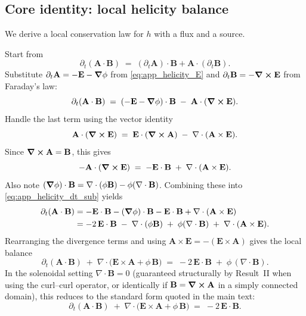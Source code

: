 \documentclass[11pt]{article}
\theoremstyle{plain}
\theoremstyle{definition}
\theoremstyle{remark}
\newcommand{\diver}{\nabla\cdot}
\newcommand{\A}{\mathbf{A}}
\newcommand{\B}{\mathbf{B}}
\newcommand{\E}{\mathbf{E}}
\begin{document}
\subsection{Core identity: local helicity balance}
We derive a local conservation law for $h$ with a flux and a source.

Start from
\begin{equation}\label{eq:app_helicity_dt_start}
  \partial_t(\A\cdot\B) \;=\; (\partial_t\A)\cdot\B + \A\cdot(\partial_t\B).
\end{equation}
Substitute $\partial_t\A = -\E - \grad\phi$ from \eqref{eq:app_helicity_E} and
$\partial_t\B=-\curl\E$ from Faraday's law:
\begin{equation}\label{eq:app_helicity_dt_sub}
  \partial_t(\A\cdot\B)
  \;=\;
  (-\E-\grad\phi)\cdot\B \;-\; \A\cdot(\curl\E).
\end{equation}
Handle the last term using the vector identity
\begin{equation}\label{eq:app_helicity_A_curlE_id}
  \A\cdot(\curl\E) \;=\; \E\cdot(\curl\A) \;-\; \diver(\A\times\E).
\end{equation}
Since $\curl\A=\B$, this gives
\[
-\A\cdot(\curl\E) \;=\; -\E\cdot\B \;+\; \diver(\A\times\E).
\]
Also note $(\grad\phi)\cdot\B = \diver(\phi\B) - \phi(\diver\B)$. Combining these into
\eqref{eq:app_helicity_dt_sub} yields
\begin{align}
  \partial_t(\A\cdot\B)
  &=
  -\E\cdot\B - (\grad\phi)\cdot\B -\E\cdot\B + \diver(\A\times\E) \\
  &=
  -2\,\E\cdot\B \;-\; \diver(\phi\B) \;+\; \phi(\diver\B) \;+\; \diver(\A\times\E).
\end{align}
Rearranging the divergence terms and using $\A\times\E=-(\E\times\A)$ gives the local balance
\begin{equation}\label{eq:app_helicity_local}
  \partial_t(\A\cdot\B)
  \;+\;
  \diver\!\Big(\E\times\A + \phi\,\B\Big)
  \;=\;
  -2\,\E\cdot\B
  \;+\;
  \phi\,(\diver\B).
\end{equation}
In the solenoidal setting $\diver\B=0$ (guaranteed structurally by Result~II when using the curl--curl
operator, or identically if $\B=\curl\A$ in a simply connected domain), this reduces to the standard
form quoted in the main text:
\begin{equation}\label{eq:app_helicity_local_divfree}
  \partial_t(\A\cdot\B)
  \;+\;
  \diver\!\Big(\E\times\A + \phi\,\B\Big)
  \;=\;
  -2\,\E\cdot\B.
\end{equation}
\end{document}
